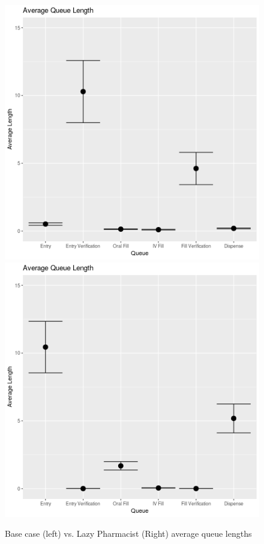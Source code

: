 \documentclass[10pt]{report}            %
\begin{document}
\begin{figure}[H]
\centering
\includegraphics[scale=.35]{BaseQueueCIs.png}
\includegraphics[scale=.35]{ProfQueueCIs.png}
\caption{Base case (left) vs. Lazy Pharmacist (Right) average queue lengths}
\label{fig:basevprof}
\end{figure}
\end{document}
